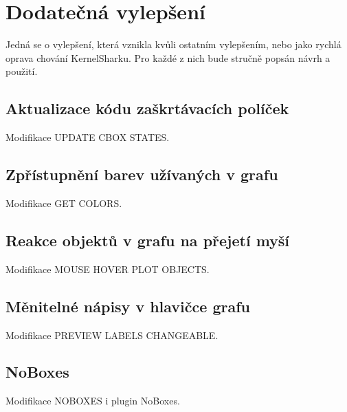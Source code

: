 \chapter{Dodatečná vylepšení}

Jedná se o vylepšení, která vznikla kvůli ostatním vylepšením, nebo jako rychlá oprava chování KernelSharku. Pro každé z nich bude stručně popsán návrh a použití.

\section{Aktualizace kódu zaškrtávacích políček}

Modifikace UPDATE CBOX STATES.

\section{Zpřístupnění barev užívaných v grafu}

Modifikace GET COLORS.

\section{Reakce objektů v grafu na přejetí myší}

Modifikace MOUSE HOVER PLOT OBJECTS.

\section{Měnitelné nápisy v hlavičce grafu}

Modifikace PREVIEW LABELS CHANGEABLE.

\section{NoBoxes}

Modifikace NOBOXES i plugin NoBoxes.
